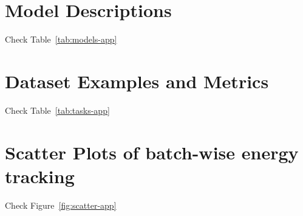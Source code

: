 \section{Model Descriptions}
\label{app:models}
Check Table~\ref{tab:models-app}




\section{Dataset Examples and Metrics}
\label{app:tasks}
Check Table~\ref{tab:tasks-app}







\section{Scatter Plots of batch-wise energy tracking}
\label{app:scatter}

Check Figure~\ref{fig:scatter-app}

